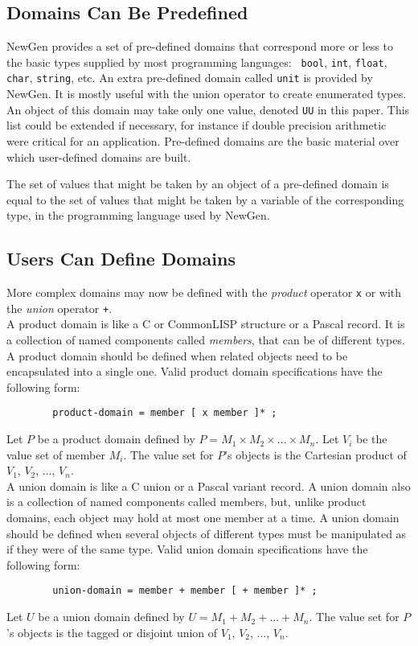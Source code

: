 \subsection{Domains Can Be Predefined}

NewGen provides a set of pre-defined domains that correspond more or
less to the basic types supplied by most programming languages: {\tt
bool}, {\tt int}, {\tt float}, {\tt char}, {\tt string}, etc.  An extra
pre-defined domain called {\tt unit} is provided by NewGen. It is mostly
useful with the union operator to create enumerated types. An object of
this domain may take only one value, denoted {\tt UU} in this paper.
This list could be extended if necessary, for instance if double
precision arithmetic were critical for an application. Pre-defined
domains are the basic material over which user-defined domains are
built.

The set of values that might be taken by an object of a pre-defined
domain is equal to the set of values that might be taken by a variable
of the corresponding type, in the programming language used by NewGen.

\subsection{Users Can Define Domains}

More complex domains may now be defined with the {\em product} operator
{\tt x} or with the {\em union} operator {\tt +}. \\

A product domain is like a C or CommonLISP structure or a Pascal record.
It is a collection of named components called {\em members}, that can be
of different types. A product domain should be defined when related
objects need to be encapsulated into a single one.  Valid product domain
specifications have the following form:
\begin{verbatim}
        product-domain = member [ x member ]* ;
\end{verbatim}
Let $P$ be a product domain defined by $P = M_1 \times M_2 \times ...
\times M_n$. Let $V_i$ be the value set of member $M_i$. The
value set for $P$'s objects is the Cartesian product of $V_1$, $V_2$,
..., $V_n$. \\

A union domain is like a C union or a Pascal variant record. A union
domain also is a collection of named components called members, but,
unlike product domains, each object may hold at most one member at a
time. A union domain should be defined when several objects of different
types must be manipulated as if they were of the same type.  Valid union
domain specifications have the following form:
\begin{verbatim}
        union-domain = member + member [ + member ]* ;
\end{verbatim}
Let $U$ be a union domain defined by $U = M_1 + M_2 + ...  + M_n$. The
value set for $P$'s objects is the tagged or disjoint union of $V_1$,
$V_2$, ..., $V_n$.

